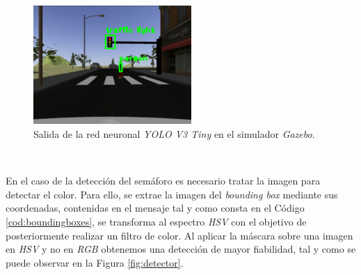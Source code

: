 \begin{figure} [h!]
	\begin{center}
		\includegraphics[width=6cm]{figs/darknetSimulator}
	\end{center}
	\caption{Salida de la red neuronal \textit{YOLO V3 Tiny} en el simulador \textit{Gazebo}.}
	\label{fig:darknetsimulator}
\end{figure}\

En el caso de la detección del semáforo es necesario tratar la imagen para detectar el color. Para ello, se extrae la imagen del \textit{bounding box} mediante sus coordenadas, contenidas en el mensaje tal y como consta en el Código \ref{cod:boundingboxes}, se transforma al espectro \textit{HSV} con el objetivo de posteriormente realizar un filtro de color. Al aplicar la máscara sobre una imagen en \textit{HSV} y no en \textit{RGB} obtenemos una detección de mayor fiabilidad, tal y como se puede observar en la Figura
\ref{fig:detector}.\\

